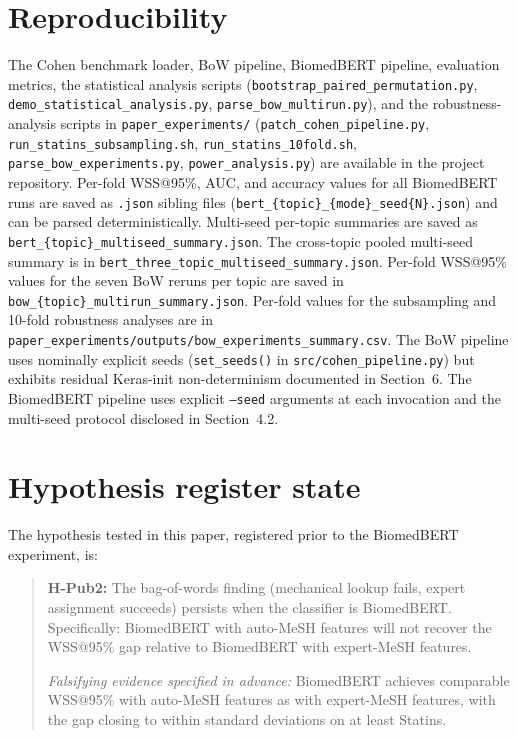 \documentclass[11pt,a4paper]{article}
\begin{document}
\appendix
\section{Reproducibility}

The Cohen benchmark loader, BoW pipeline, BiomedBERT pipeline, evaluation metrics, the statistical analysis scripts (\texttt{bootstrap\_paired\_permutation.py}, \texttt{demo\_statistical\_analysis.py}, \texttt{parse\_bow\_multirun.py}), and the robustness-analysis scripts in \texttt{paper\_experiments/} (\texttt{patch\_cohen\_pipeline.py}, \texttt{run\_statins\_subsampling.sh}, \texttt{run\_statins\_10fold.sh}, \texttt{parse\_bow\_experiments.py}, \texttt{power\_analysis.py}) are available in the project repository. Per-fold WSS@95\%, AUC, and accuracy values for all BiomedBERT runs are saved as \texttt{.json} sibling files (\texttt{bert\_\{topic\}\_\{mode\}\_seed\{N\}.json}) and can be parsed deterministically. Multi-seed per-topic summaries are saved as \texttt{bert\_\{topic\}\_multiseed\_summary.json}. The cross-topic pooled multi-seed summary is in \texttt{bert\_three\_topic\_multiseed\_summary.json}. Per-fold WSS@95\% values for the seven BoW reruns per topic are saved in \texttt{bow\_\{topic\}\_multirun\_summary.json}. Per-fold values for the subsampling and 10-fold robustness analyses are in \texttt{paper\_experiments/outputs/bow\_experiments\_summary.csv}. The BoW pipeline uses nominally explicit seeds (\texttt{set\_seeds()} in \texttt{src/cohen\_pipeline.py}) but exhibits residual Keras-init non-determinism documented in Section~6. The BiomedBERT pipeline uses explicit \texttt{--seed} arguments at each invocation and the multi-seed protocol disclosed in Section~4.2.

\section{Hypothesis register state}

The hypothesis tested in this paper, registered prior to the BiomedBERT experiment, is:

\begin{quote}
\textbf{H-Pub2:} The bag-of-words finding (mechanical lookup fails, expert assignment succeeds) persists when the classifier is BiomedBERT. Specifically: BiomedBERT with auto-MeSH features will not recover the WSS@95\% gap relative to BiomedBERT with expert-MeSH features.

\textit{Falsifying evidence specified in advance:} BiomedBERT achieves comparable WSS@95\% with auto-MeSH features as with expert-MeSH features, with the gap closing to within standard deviations on at least Statins.
\end{quote}
\end{document}
